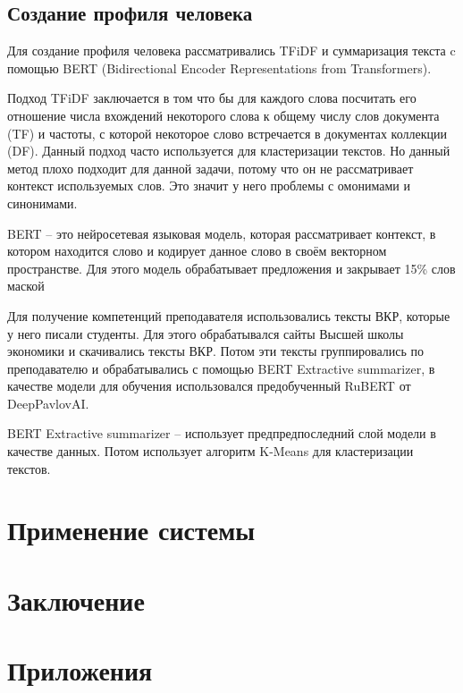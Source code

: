 \documentclass[PI,KR]{HSEUniversity}
\begin{document}
\section{Создание профиля человека}
Для создание профиля человека рассматривались TFiDF и суммаризация текста c помощью BERT\cite{devlin2019bert} (Bidirectional Encoder Representations from Transformers). 

Подход TFiDF заключается в том что бы для каждого слова посчитать его отношение числа вхождений некоторого слова к общему числу слов документа (TF) и частоты, с которой некоторое слово встречается в документах коллекции (DF). Данный подход часто используется для кластеризации текстов. Но данный метод плохо подходит для данной задачи, потому что он не рассматривает контекст используемых слов. Это значит у него проблемы с омонимами и синонимами.

BERT -- это нейросетевая языковая модель, которая рассматривает контекст, в котором находится слово и кодирует данное слово в своём векторном пространстве. Для этого модель обрабатывает предложения и закрывает 15\% слов маской

Для получение компетенций преподавателя использовались тексты ВКР, которые у него писали студенты. Для этого обрабатывался сайты Высшей школы экономики и скачивались тексты ВКР. Потом эти тексты группировались по преподавателю и обрабатывались с помощью BERT Extractive summarizer, в качестве модели для обучения использовался предобученный RuBERT от DeepPavlovAI. 

BERT Extractive summarizer \cite{miller2019leveraging} -- использует предпредпоследний слой модели в качестве данных. Потом использует алгоритм K-Means для кластеризации текстов.
\chapter{Применение системы}

\chapter*{Заключение}
\putbibliography %

\chapter*{Приложения}
\end{document}
